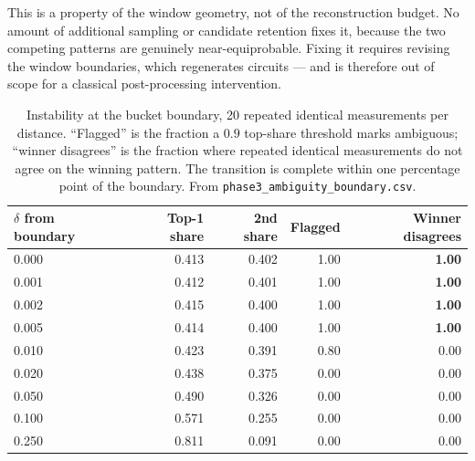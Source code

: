 This is a property of the window geometry, not of the reconstruction budget.
No amount of additional sampling or candidate retention fixes it, because
the two competing patterns are genuinely near-equiprobable. Fixing it
requires revising the window boundaries, which regenerates circuits --- and
is therefore out of scope for a classical post-processing intervention.

\begin{table}[htbp]
\centering\small
\caption{Instability at the bucket boundary, 20 repeated identical
measurements per distance. ``Flagged'' is the fraction a $0.9$ top-share
threshold marks ambiguous; ``winner disagrees'' is the fraction where
repeated identical measurements do not agree on the winning pattern. The
transition is complete within one percentage point of the boundary. From
\texttt{phase3\_ambiguity\_boundary.csv}.}
\label{tab:ambiguity}
\begin{tabular}{@{}lrrrr@{}}
\toprule
$\delta$ from boundary & Top-1 share & 2nd share & Flagged & Winner disagrees \\
\midrule
0.000 & 0.413 & 0.402 & 1.00 & \textbf{1.00} \\
0.001 & 0.412 & 0.401 & 1.00 & \textbf{1.00} \\
0.002 & 0.415 & 0.400 & 1.00 & \textbf{1.00} \\
0.005 & 0.414 & 0.400 & 1.00 & \textbf{1.00} \\
0.010 & 0.423 & 0.391 & 0.80 & 0.00 \\
0.020 & 0.438 & 0.375 & 0.00 & 0.00 \\
0.050 & 0.490 & 0.326 & 0.00 & 0.00 \\
0.100 & 0.571 & 0.255 & 0.00 & 0.00 \\
0.250 & 0.811 & 0.091 & 0.00 & 0.00 \\
\bottomrule
\end{tabular}
\end{table}
